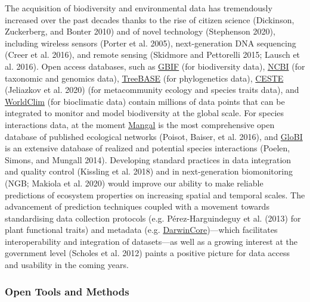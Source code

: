 \documentclass[11pt]{article}
\begin{document}
The acquisition of biodiversity and environmental data has tremendously
increased over the past decades thanks to the rise of citizen science
(Dickinson, Zuckerberg, and Bonter 2010) and of novel technology
(Stephenson 2020), including wireless sensors (Porter et al. 2005),
next-generation DNA sequencing (Creer et al. 2016), and remote sensing
(Skidmore and Pettorelli 2015; Lausch et al. 2016). Open access
databases, such as \href{https://www.gbif.org/}{GBIF} (for biodiversity
data), \href{https://www.ncbi.nlm.nih.gov/}{NCBI} (for taxonomic and
genomics data),
\href{https://www.treebase.org/treebase-web/home.html}{TreeBASE} (for
phylogenetics data), \href{https://icestes.github.io/}{CESTE} (Jeliazkov
et al. 2020) (for metacommunity ecology and species traits data), and
\href{https://www.worldclim.org/data/bioclim.html}{WorldClim} (for
bioclimatic data) contain millions of data points that can be integrated
to monitor and model biodiversity at the global scale. For species
interactions data, at the moment \href{https://mangal.io/\#/}{Mangal} is
the most comprehensive open database of published ecological networks
(Poisot, Baiser, et al. 2016), and
\href{https://www.globalbioticinteractions.org/about}{GloBI} is an
extensive database of realized and potential species interactions
(Poelen, Simons, and Mungall 2014). Developing standard practices in
data integration and quality control (Kissling et al. 2018) and in
next-generation biomonitoring (NGB; Makiola et al. 2020) would improve
our ability to make reliable predictions of ecosystem properties on
increasing spatial and temporal scales. The advancement of prediction
techniques coupled with a movement towards standardising data collection
protocols (e.g. Pérez-Harguindeguy et al. (2013) for plant functional
traits) and metadata (e.g.
\href{https://www.tdwg.org}{DarwinCore})---which facilitates
interoperability and integration of datasets---as well as a growing
interest at the government level (Scholes et al. 2012) paints a positive
picture for data access and usability in the coming years.

\hypertarget{open-tools-and-methods}{%
\subsubsection{Open Tools and Methods}\label{open-tools-and-methods}}
\end{document}
